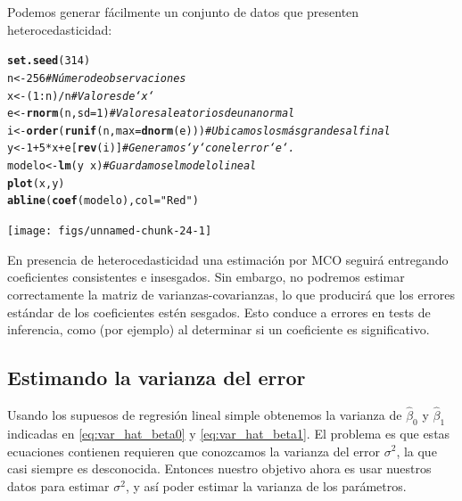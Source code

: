 \documentclass{report}\usepackage[]{graphicx}\usepackage[]{color}
\makeatletter
\newcommand{\hlnum}[1]{\textcolor[rgb]{0.686,0.059,0.569}{#1}}%
\newcommand{\hlstr}[1]{\textcolor[rgb]{0.192,0.494,0.8}{#1}}%
\newcommand{\hlcom}[1]{\textcolor[rgb]{0.678,0.584,0.686}{\textit{#1}}}%
\newcommand{\hlopt}[1]{\textcolor[rgb]{0,0,0}{#1}}%
\newcommand{\hlstd}[1]{\textcolor[rgb]{0.345,0.345,0.345}{#1}}%
\newcommand{\hlkwb}[1]{\textcolor[rgb]{0.69,0.353,0.396}{#1}}%
\newcommand{\hlkwc}[1]{\textcolor[rgb]{0.333,0.667,0.333}{#1}}%
\newcommand{\hlkwd}[1]{\textcolor[rgb]{0.737,0.353,0.396}{\textbf{#1}}}%
\newenvironment{kframe}{%
 \def\at@end@of@kframe{}%
 \ifinner\ifhmode%
  \def\at@end@of@kframe{\end{minipage}}%
  \begin{minipage}{\columnwidth}%
 \fi\fi%
 \def\FrameCommand##1{\hskip\@totalleftmargin \hskip-\fboxsep
 \colorbox{shadecolor}{##1}\hskip-\fboxsep
     \hskip-\linewidth \hskip-\@totalleftmargin \hskip\columnwidth}%
 \MakeFramed {\advance\hsize-\width
   \@totalleftmargin\z@ \linewidth\hsize
   \@setminipage}}%
 {\par\unskip\endMakeFramed%
 \at@end@of@kframe}
\newenvironment{knitrout}{}{} %
\makeatother
\begin{document}
Podemos generar fácilmente un conjunto de datos que presenten heterocedasticidad:

\begin{knitrout}
\color{fgcolor}\begin{kframe}
\begin{alltt}
\hlkwd{set.seed}\hlstd{(}\hlnum{314}\hlstd{)}
\hlstd{n} \hlkwb{<-} \hlnum{256}                           \hlcom{# Número de observaciones}
\hlstd{x} \hlkwb{<-} \hlstd{(}\hlnum{1}\hlopt{:}\hlstd{n)}\hlopt{/}\hlstd{n}                       \hlcom{# Valores de `x`}
\hlstd{e} \hlkwb{<-} \hlkwd{rnorm}\hlstd{(n,} \hlkwc{sd}\hlstd{=}\hlnum{1}\hlstd{)}                \hlcom{# Valores aleatorios de una normal}
\hlstd{i} \hlkwb{<-} \hlkwd{order}\hlstd{(}\hlkwd{runif}\hlstd{(n,} \hlkwc{max}\hlstd{=}\hlkwd{dnorm}\hlstd{(e)))} \hlcom{# Ubicamos los más grandes al final}
\hlstd{y} \hlkwb{<-} \hlnum{1} \hlopt{+} \hlnum{5} \hlopt{*} \hlstd{x} \hlopt{+} \hlstd{e[}\hlkwd{rev}\hlstd{(i)]}         \hlcom{# Generamos `y` con el error `e`.}
\hlstd{modelo} \hlkwb{<-} \hlkwd{lm}\hlstd{(y} \hlopt{~} \hlstd{x)}                \hlcom{# Guardamos el modelo lineal}
\hlkwd{plot}\hlstd{(x, y)}
\hlkwd{abline}\hlstd{(}\hlkwd{coef}\hlstd{(modelo),} \hlkwc{col} \hlstd{=} \hlstr{"Red"}\hlstd{)}
\end{alltt}
\end{kframe}

{\centering \texttt{[image: figs/unnamed-chunk-24-1]} 

}



\end{knitrout}

En presencia de heterocedasticidad una estimación por MCO seguirá entregando coeficientes consistentes e insesgados. Sin embargo, no podremos estimar correctamente la matriz de varianzas-covarianzas, lo que producirá que los errores estándar de los coeficientes estén sesgados. Esto conduce a errores en tests de inferencia, como (por ejemplo) al determinar si un coeficiente es significativo.

\subsection{Estimando la varianza del error}

Usando los supuesos de regresión lineal simple obtenemos la varianza de $\hat\beta_0$ y $\hat\beta_1$ indicadas en \eqref{eq:var_hat_beta0} y \eqref{eq:var_hat_beta1}.
El problema es que estas ecuaciones contienen requieren que conozcamos la varianza del error $\sigma^2$, la que casi siempre es desconocida.
Entonces nuestro objetivo ahora es usar nuestros datos para estimar $\sigma^2$, y así poder estimar la varianza de los parámetros.
\end{document}
